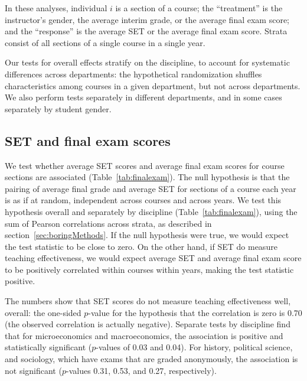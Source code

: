 \documentclass[12pt]{article}
\begin{document}
In these analyses, individual $i$ is a section of a course; the ``treatment'' is the instructor's gender, 
the average interim grade, or the average final exam score;
and the ``response'' is the average SET or the average final exam score.
Strata consist of all sections of a single course in a single year.

Our tests for overall effects stratify on the discipline, to account for systematic
differences across departments:
the hypothetical randomization shuffles characteristics among courses in a given
department, but not across departments.
We also perform tests separately in different departments, and in some cases separately by
student gender.

\subsection{SET and final exam scores} \label{sec:Fr-set-final}
We test whether average SET scores and average final exam scores for course
sections are associated (Table~\ref{tab:finalexam}). 
The null hypothesis is that the pairing
of average final grade and average SET for sections of a course each year is as if at random,
independent across courses and across years.
We test this hypothesis overall and separately by discipline 
(Table~\ref{tab:finalexam}), using the sum of Pearson correlations across strata, as described 
in section~\ref{sec:boringMethods}.
If the null hypothesis were true, we would expect the test statistic to be 
close to zero.
On the other hand, if SET do measure teaching effectiveness, we would expect average
SET and average final exam score to be positively correlated within courses within years, 
making the test statistic positive. 

The numbers show that SET scores do not measure teaching effectiveness well, overall:
the one-sided $p$-value for the hypothesis that the correlation is zero is 0.70 (the
observed correlation is actually negative). 
Separate tests by discipline find that for microeconomics and macroeconomics, the 
association is positive and statistically
significant ($p$-values of 0.03 and 0.04). 
For history, political science, and sociology, which have exams that are graded anonymously,
the association is not significant ($p$-values 0.31, 0.53, and 0.27, respectively). 
\end{document}
